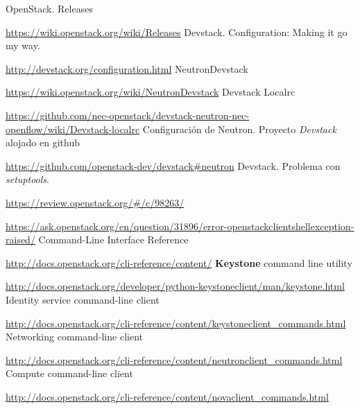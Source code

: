 \documentclass{article}
\begin{document}
\renewcommand{\bibname}{Referencias}
\begin{thebibliography}{99}
OpenStack. Releases

\url{https://wiki.openstack.org/wiki/Releases}
Devstack. Configuration: Making it go my way.

\url{http://devstack.org/configuration.html}
NeutronDevstack

\url{https://wiki.openstack.org/wiki/NeutronDevstack}
Devstack Localrc

\url{https://github.com/nec-openstack/devstack-neutron-nec-openflow/wiki/Devstack-localrc}
Configuración de Neutron. Proyecto \emph{Devstack} alojado en github

\url{https://github.com/openstack-dev/devstack#neutron}
Devstack. Problema con \emph{setuptools}.

\url{https://review.openstack.org/#/c/98263/}

\url{https://ask.openstack.org/en/question/31896/error-openstackclientshellexception-raised/}
Command-Line Interface Reference

\url{http://docs.openstack.org/cli-reference/content/}
\textbf{Keystone} command line utility

\url{http://docs.openstack.org/developer/python-keystoneclient/man/keystone.html}
Identity service command-line client

\url{http://docs.openstack.org/cli-reference/content/keystoneclient_commands.html}
Networking command-line client

\url{http://docs.openstack.org/cli-reference/content/neutronclient_commands.html}
Compute command-line client

\url{http://docs.openstack.org/cli-reference/content/novaclient_commands.html}
%
\end{thebibliography}
\end{document}
